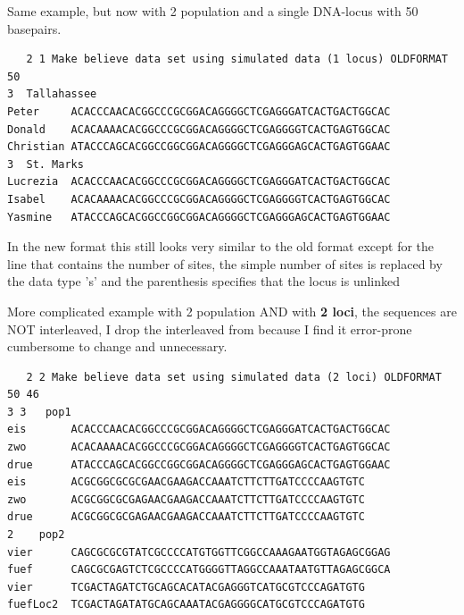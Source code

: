\smallerskip
Same example, but now with 2 population and a single DNA-locus with 50 basepairs.
\begin{flushleft}
\begin{small}
\begin{tt}
\begin{verbatim}
   2 1 Make believe data set using simulated data (1 locus) OLDFORMAT
50 
3  Tallahassee 
Peter     ACACCCAACACGGCCCGCGGACAGGGGCTCGAGGGATCACTGACTGGCAC
Donald    ACACAAAACACGGCCCGCGGACAGGGGCTCGAGGGGTCACTGAGTGGCAC
Christian ATACCCAGCACGGCCGGCGGACAGGGGCTCGAGGGAGCACTGAGTGGAAC
3  St. Marks 
Lucrezia  ACACCCAACACGGCCCGCGGACAGGGGCTCGAGGGATCACTGACTGGCAC
Isabel    ACACAAAACACGGCCCGCGGACAGGGGCTCGAGGGGTCACTGAGTGGCAC
Yasmine   ATACCCAGCACGGCCGGCGGACAGGGGCTCGAGGGAGCACTGAGTGGAAC
\end{verbatim}
\end{tt}
\end{small}
\end{flushleft}
In the new format this still looks very similar to the old format except for the line that contains the number of sites,
the simple number of sites is replaced by the data type 's' and the parenthesis specifies that the locus is unlinked


More complicated example with 2 population AND with {\bf 2 loci}, the sequences are NOT interleaved, I drop the interleaved from because I find it error-prone cumbersome to change and unnecessary.
\begin{flushleft}
\begin{small}
\begin{tt}
\begin{verbatim}
   2 2 Make believe data set using simulated data (2 loci) OLDFORMAT
50 46 
3 3   pop1 
eis       ACACCCAACACGGCCCGCGGACAGGGGCTCGAGGGATCACTGACTGGCAC
zwo       ACACAAAACACGGCCCGCGGACAGGGGCTCGAGGGGTCACTGAGTGGCAC
drue      ATACCCAGCACGGCCGGCGGACAGGGGCTCGAGGGAGCACTGAGTGGAAC
eis       ACGCGGCGCGCGAACGAAGACCAAATCTTCTTGATCCCCAAGTGTC
zwo       ACGCGGCGCGAGAACGAAGACCAAATCTTCTTGATCCCCAAGTGTC
drue      ACGCGGCGCGAGAACGAAGACCAAATCTTCTTGATCCCCAAGTGTC
2    pop2
vier      CAGCGCGCGTATCGCCCCATGTGGTTCGGCCAAAGAATGGTAGAGCGGAG
fuef      CAGCGCGAGTCTCGCCCCATGGGGTTAGGCCAAATAATGTTAGAGCGGCA
vier      TCGACTAGATCTGCAGCACATACGAGGGTCATGCGTCCCAGATGTG
fuefLoc2  TCGACTAGATATGCAGCAAATACGAGGGGCATGCGTCCCAGATGTG
\end{verbatim}
\end{tt}
\end{small}
\end{flushleft}
